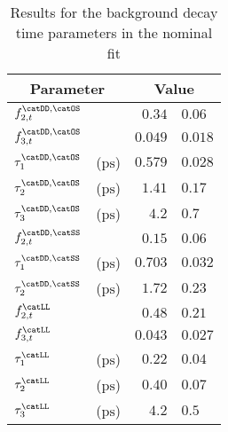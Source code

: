 \begin{table}
  \caption{Results for the background decay time parameters in the nominal fit}
  \label{tab:app:measurement_of_sin2beta:cpv_measurement:results:time:bkg}
  \centering
  \begin{tabular}{llr@{$\,\pm\,$}l}
      \toprule
      \multicolumn{2}{c}{Parameter}       & \multicolumn{2}{c}{Value}                  \\
      \midrule
      $f^{\catDD,\catOS}_{2,t}$   &                       & $0.34$    & $0.06$   \\
      $f^{\catDD,\catOS}_{3,t}$   &                       & $0.049$   & $0.018$  \\
      $\tau^{\catDD,\catOS}_{1}$  & ($\si{\pico\second}$) & $0.579$   & $0.028$  \\
      $\tau^{\catDD,\catOS}_{2}$  & ($\si{\pico\second}$) & $1.41$    & $0.17$   \\
      $\tau^{\catDD,\catOS}_{3}$  & ($\si{\pico\second}$) & $4.2$     & $0.7$    \\
      \midrule
      $f^{\catDD,\catSS}_{2,t}$   &                       & $0.15$    & $0.06$   \\
      $\tau^{\catDD,\catSS}_{1}$  & ($\si{\pico\second}$) & $0.703$   & $0.032$   \\
      $\tau^{\catDD,\catSS}_{2}$  & ($\si{\pico\second}$) & $1.72$    & $0.23$   \\
      \midrule
      $f^{\catLL}_{2,t}$          &                       & $0.48$    & $0.21$   \\
      $f^{\catLL}_{3,t}$          &                       & $0.043$   & $0.027$  \\
      $\tau^{\catLL}_{1}$         & ($\si{\pico\second}$) & $0.22$    & $0.04$  \\
      $\tau^{\catLL}_{2}$         & ($\si{\pico\second}$) & $0.40$    & $0.07$   \\
      $\tau^{\catLL}_{3}$         & ($\si{\pico\second}$) & $4.2$     & $0.5$    \\
      \bottomrule
    \end{tabular}
\end{table}
